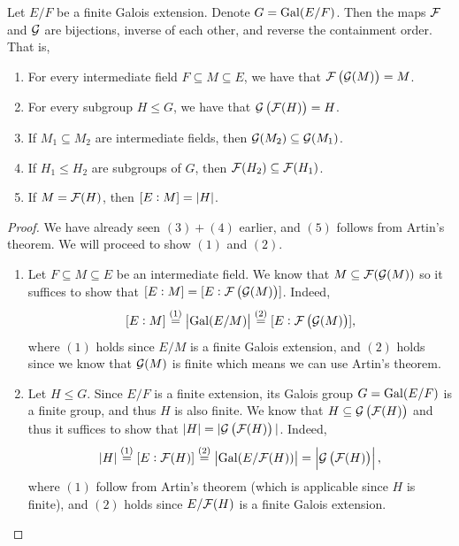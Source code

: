 \documentclass[11pt,a4paper]{article}
\begin{document}
\begin{theorem} 
  \label{thm:galois-part-a}
  Let $E/F$ be a finite Galois extension.
  Denote $G = \operatorname{Gal}(E/F)$.
  Then the maps $\mathcal F$ and $\mathcal G$
  are bijections, inverse of each other, and reverse the containment
  order.
  That is,
  \begin{enumerate}
    \item[(1)] For every intermediate field $F \subseteq M \subseteq E$,
      we have that $\FF\del{\GG(M)} = M$.
    \item[(2)] For every subgroup $H \leqslant G$,
      we have that $\GG\del{\FF(H)} = H$.
    \item[(3)] If $M_1 \subseteq M_2$ are intermediate fields,
      then $\mathcal G(M_2) \subseteq \mathcal G(M_1)$.
    \item[(4)] If $H_1 \leqslant H_2$ are subgroups of $G$, then
      $\mathcal F(H_2) \subseteq \mathcal F(H_1)$.
    \item[(5)] If $M = \mathcal F(H)$, then $[E : M] = \left\lvert H\right\rvert$.
  \end{enumerate}
\end{theorem}
\begin{proof}
  We have already seen $(3) + (4)$ earlier, and $(5)$ follows from Artin's
  theorem. We will proceed to show $(1)$ and $(2)$.
  \begin{enumerate} 
    \item[(1)] Let $F \subseteq M \subseteq E$ be an intermediate field.
      We know that $M \subseteq \mathcal F(\mathcal G(M))$ so it suffices
      to show that $[E : M] = [E : \FF\del{\GG(M)}]$.
      Indeed,
      \[
        [E : M] \overset{(1)}{=}
        \abs{\Gal(E/M)} \overset{(2)}{=}
        [E : \FF\del{\GG(M)}],
      \]
      where $(1)$ holds since $E/M$ is a finite Galois extension,
      and $(2)$ holds since we know that $\mathcal G(M)$ is finite which means
      we can use Artin's theorem.
    \item[(2)] Let $H \leqslant G$.
    Since $E/F$ is a finite extension,
    its Galois group $G = \operatorname{Gal}(E/F)$ is a finite group,
    and thus $H$ is also finite.
    We know that $H \subseteq \GG\del{\FF(H)}$
    and thus it suffices to show that $\abs{H} = |\GG\del{\FF(H)}|$.
    Indeed,
    \[
      \abs{H} \overset{(1)}{=}
      [E : \FF(H)] \overset{(2)}{=}
      \abs{\Gal(E/\FF(H))} = \abs{\GG\del{\FF(H)}},
    \]
    where $(1)$ follow from Artin's theorem (which is applicable
    since $H$ is finite), and $(2)$ holds since $E/\mathcal F(H)$ is
    a finite Galois extension.
  \end{enumerate}
\end{proof}
\end{document}
